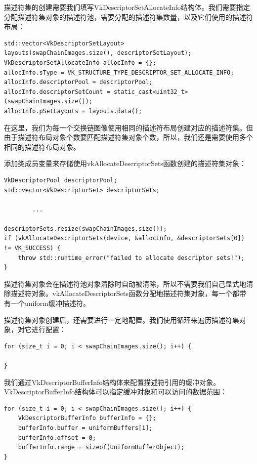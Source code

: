 \documentclass{ctexart}
\begin{document}
描述符集的创建需要我们填写VkDescriptorSetAllocateInfo结构体。我们需要指定分配描述符集对象的描述符池，需要分配的描述符集数量，以及它们使用的描述符布局：

\begin{lstlisting}[language={[ANSI]C}]
std::vector<VkDescriptorSetLayout>
layouts(swapChainImages.size(), descriptorSetLayout);
VkDescriptorSetAllocateInfo allocInfo = {};
allocInfo.sType = VK_STRUCTURE_TYPE_DESCRIPTOR_SET_ALLOCATE_INFO;
allocInfo.descriptorPool = descriptorPool;
allocInfo.descriptorSetCount = static_cast<uint32_t>(swapChainImages.size());
allocInfo.pSetLayouts = layouts.data();
\end{lstlisting}

在这里，我们为每一个交换链图像使用相同的描述符布局创建对应的描述符集。但由于描述符布局对象个数要匹配描述符集对象个数，所以，我们还是需要使用多个相同的描述符布局对象。

添加类成员变量来存储使用vkAllocateDescriptorSets函数创建的描述符集对象：

\begin{lstlisting}[language={[ANSI]C}]
VkDescriptorPool descriptorPool;
std::vector<VkDescriptorSet> descriptorSets;

		...

descriptorSets.resize(swapChainImages.size());
if (vkAllocateDescriptorSets(device, &allocInfo, &descriptorSets[0]) != VK_SUCCESS) {
	throw std::runtime_error("failed to allocate descriptor sets!");
}
\end{lstlisting}

描述符集对象会在描述符池对象清除时自动被清除，所以不需要我们自己显式地清除描述符对象。vkAllocateDescriptorSets函数分配地描述符集对象，每一个都带有一个uniform缓冲描述符。

描述符集对象创建后，还需要进行一定地配置。我们使用循环来遍历描述符集对象，对它进行配置：

\begin{lstlisting}[language={[ANSI]C}]
for (size_t i = 0; i < swapChainImages.size(); i++) {

}
\end{lstlisting}

我们通过VkDescriptorBufferInfo结构体来配置描述符引用的缓冲对象。VkDescriptorBufferInfo结构体可以指定缓冲对象和可以访问的数据范围：

\begin{lstlisting}[language={[ANSI]C}]
for (size_t i = 0; i < swapChainImages.size(); i++) {
	VkDescriptorBufferInfo bufferInfo = {};
	bufferInfo.buffer = uniformBuffers[i];
	bufferInfo.offset = 0;
	bufferInfo.range = sizeof(UniformBufferObject);
}
\end{lstlisting}
\end{document}
